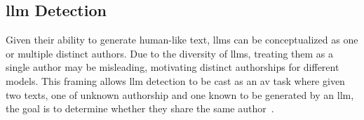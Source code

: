 



\subsection{\acs{llm} Detection}
Given their ability to generate human-like text, \acp{llm} can be conceptualized as one or multiple distinct authors. 
Due to the diversity of \acp{llm}, treating them as a single author may be misleading, motivating distinct authorships for different models. 
This framing allows \ac{llm} detection to be cast as an \ac{av} task where given two texts, one of unknown authorship and one known to be generated by an \ac{llm}, the goal is to determine whether they share the same author~\citep{llm_detection_av_2025}.


